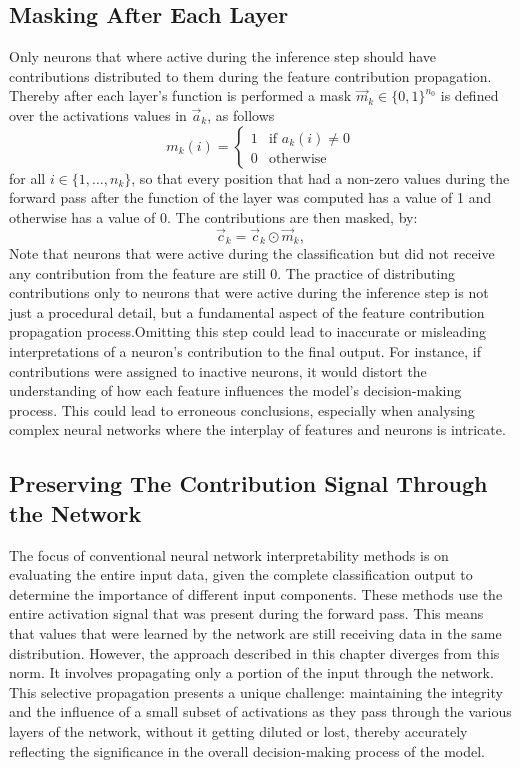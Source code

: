 \subsection{Masking After Each Layer}
Only neurons that where active during the inference step should have contributions distributed to them during the feature contribution propagation. Thereby after each layer's function is performed a mask $\vec{m}_k\in \{0,1\}^{n_0}$ is defined over the activations values in $\vec{a}_k$, as follows 
\begin{equation*}
    \label{eq:masking}
    m_k(i) = \begin{cases}
    1 & \mbox{if $a_k(i)\not=0$}\\
    0 & \mbox{otherwise}
    \end{cases} 
\end{equation*}
for all $i \in \{1,\dots, n_k\}$, so that every position that had a non-zero values during the forward pass after the function of the layer was computed has a value of 1 and otherwise has a value of 0. The contributions are then masked, by:
    \begin{equation*}
    \label{masking}
        \vec{c}_k = \vec{c}_k\odot \vec{m}_k,
    \end{equation*}
Note that neurons that were active during the classification but did not receive any contribution from the feature are still 0. The practice of distributing contributions only to neurons that were active during the inference step is not just a procedural detail, but a fundamental aspect of the feature contribution propagation process.Omitting this step could lead to inaccurate or misleading interpretations of a neuron's contribution to the final output. For instance, if contributions were assigned to inactive neurons, it would distort the understanding of how each feature influences the model's decision-making process. This could lead to erroneous conclusions, especially when analysing complex neural networks where the interplay of features and neurons is intricate.

\subsection{Preserving The Contribution Signal Through the Network}

The focus of conventional neural network interpretability methods is on evaluating the entire input data, given the complete classification output to determine the importance of different input components. These methods use the entire activation signal that was present during the forward pass. This means that values that were learned by the network are still receiving data in the same distribution. However, the approach described in this chapter diverges from this norm. It involves propagating only a portion of the input through the network. This selective propagation presents a unique challenge: maintaining the integrity and the influence of a small subset of activations as they pass through the various layers of the network, without it getting diluted or lost, thereby accurately reflecting the significance in the overall decision-making process of the model.

